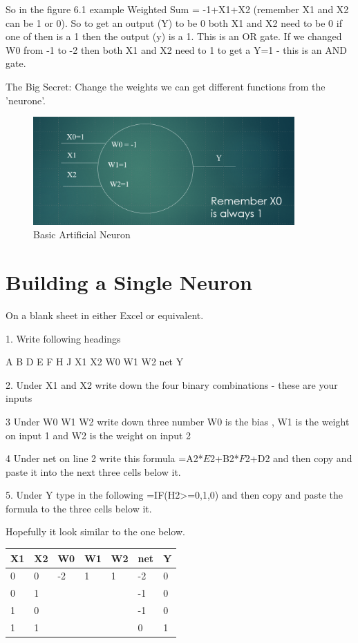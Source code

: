 So in the figure 6.1 example Weighted Sum = -1+X1+X2 (remember X1 and X2 can be 1 or 0). So to get an output (Y) to be 0 both X1 and X2 need to be 0 if one of then is a 1 then the output (y) is a 1. This is an OR gate. If we changed W0 from -1 to -2 then both X1 and X2 need to 1 to get a Y=1 - this is an AND gate.

The Big Secret: Change the weights we can get different functions from the 'neurone'.

\begin{figure}
    \centering
    \includegraphics[width=10cm]{chapters/chAi1/figures/overall neurone2.png}
    \caption{Basic Artificial Neuron}
    \label{fig:basicneuron}
\end{figure}

\section{Building a Single Neuron}

On a blank sheet in either Excel or equivalent. 

1.  Write following headings 

A                B                            D                 E                 F                                      H                             J
X1	X2	 	W0	W1	W2	 	net 	 	Y

2.  Under X1 and X2 write down the four binary combinations - these are your inputs 

3   Under W0 W1 W2 write down three number W0 is the bias , W1 is the weight on input 1 and W2 is the weight on input 2

4 Under net on line 2 write this formula  =A2*$E$2+B2*$F$2+D2 and then copy and paste it into the next three cells below it.

5. Under Y type in the following  =IF(H2>=0,1,0)  and then copy and paste the formula to the three cells below it.


Hopefully it look similar to the one below.

\begin{tabular}{lllllll} \hline
X1 & X2 & W0 & W1 &	W2 & net & Y	 	 \\ \hline
0  & 0  & -2  & 1  & 1	 & 	-2 & 	0 \\ \hline
0  & 1	&     &    &     & 	-1 & 	0 \\ \hline  
1  & 0	&  	  &    & 	  & -1 & 	0 \\ \hline
1  & 1	& 	  &    &      &   0	 &  	1 \\ \hline
\end{tabular}

